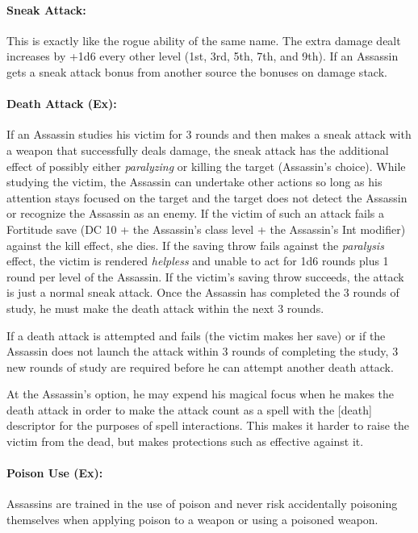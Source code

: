 \paragraph{Sneak Attack:}
This is exactly like the rogue ability of the same name. 
The extra damage dealt increases by +1d6 every other level (1st, 3rd, 5th, 7th, and 9th). 
If an Assassin gets a sneak attack bonus from another source the bonuses on damage stack.

\paragraph{Death Attack (Ex):}
If an Assassin studies his victim for 3 rounds and then makes a sneak attack with a weapon that successfully deals damage, 
the sneak attack has the additional effect of possibly either \emph{paralyzing} or killing the target (Assassin's choice). 
While studying the victim, the Assassin can undertake other actions so long as his attention stays focused on the target 
and the target does not detect the Assassin or recognize the Assassin as an enemy. 
If the victim of such an attack fails a Fortitude save (DC 10 + the Assassin's class level + the Assassin's Int modifier) 
against the kill effect, she dies. If the saving throw fails against the \emph{paralysis} effect, 
the victim is rendered \emph{helpless} and unable to act for 1d6 rounds plus 1 round per level of the Assassin. 
If the victim's saving throw succeeds, the attack is just a normal sneak attack. 
Once the Assassin has completed the 3 rounds of study, he must make the death attack within the next 3 rounds.

If a death attack is attempted and fails (the victim makes her save) 
or if the Assassin does not launch the attack within 3 rounds of completing the study, 
3 new rounds of study are required before he can attempt another death attack.

At the Assassin's option, he may expend his magical focus when he makes the death attack 
in order to make the attack count as a spell with the [death] descriptor for the purposes of spell interactions.
This makes it harder to raise the victim from the dead, but makes protections such as  effective against it.
\paragraph{Poison Use (Ex):}
Assassins are trained in the use of poison and never risk accidentally poisoning themselves when applying poison to a weapon or using a poisoned weapon.

